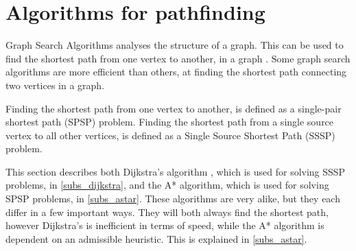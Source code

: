 \section{Algorithms for pathfinding}
Graph Search Algorithms analyses the structure of a graph. This can be used to find the shortest path from one vertex to another, in a graph \cite{Cormen2009}. Some graph search algorithms are more efficient than others, at finding the shortest path connecting two vertices in a graph.

Finding the shortest path from one vertex to another, is defined as a single-pair shortest path (SPSP) problem. Finding the shortest path from a single source vertex to all other vertices, is defined as a Single Source Shortest Path (SSSP) problem.


This section describes both Dijkstra's algorithm , which is used for solving SSSP problems, in \cref{subs_dijkstra}, and the A* algorithm, which is used for solving SPSP problems, in \cref{subs_astar}. These algorithms are very alike, but they each differ in a few important ways. They will both always find the shortest path, however Dijkstra's is inefficient in terms of speed, while the A* algorithm is dependent on an admissible heuristic. This is explained in \cref{subs_astar}.



